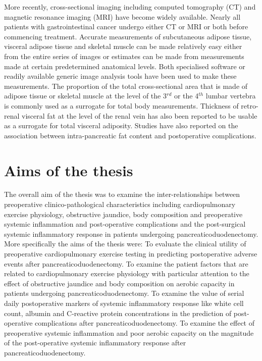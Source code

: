 More recently, cross-sectional imaging including computed tomography (CT) and magnetic resonance imaging (MRI) have become widely available. 
Nearly all patients with gastrointestinal cancer undergo either CT or MRI or both before commencing treatment. 
Accurate measurements of subcutaneous adipose tissue, visceral adipose tissue and skeletal muscle can be made relatively easy either from the entire series of images or estimates can be made from measurements made at certain predetermined anatomical levels. 
Both specialised software or readily available generic image analysis tools have been used to make these measurements. 
The proportion of the total cross-sectional area that is made of adipose tissue or skeletal muscle at the level of the 3$^{rd}$ or the 4$^{th}$ lumbar vertebra is commonly used as a surrogate for total body measurements. 
Thickness of retro-renal visceral fat at the level of the renal vein has also been reported to be usable as a surrogate for total visceral adiposity. 
Studies have also reported on the association between intra-pancreatic fat content and postoperative complications.

\clearpage
\section{Aims of the thesis}
\vfill
The overall aim of the thesis was to examine the inter-relationships between preoperative clinico-pathological characteristics including cardiopulmonary exercise physiology, obstructive jaundice, body composition and preoperative systemic inflammation and post-operative complications and the post-surgical systemic inflammatory response in patients undergoing pancreaticoduodenectomy.
\vfill
More specifically the aims of the thesis were:
\vfill
To evaluate the clinical utility of preoperative cardiopulmonary exercise testing in predicting postoperative adverse events after pancreaticoduodenectomy.
\vfill
To examine the patient factors that are related to cardiopulmonary exercise physiology with particular attention to the effect of obstructive jaundice and body composition on aerobic capacity in patients undergoing pancreaticoduodenectomy.
\vfill
To examine the value of serial daily postoperative markers of systemic inflammatory response like white cell count, albumin and C-reactive protein concentrations in the prediction of post-operative complications after pancreaticoduodenectomy.
\vfill
To examine the effect of preoperative systemic inflammation and poor aerobic capacity on the magnitude of the post-operative systemic inflammatory response after pancreaticoduodenectomy.
\vfill
